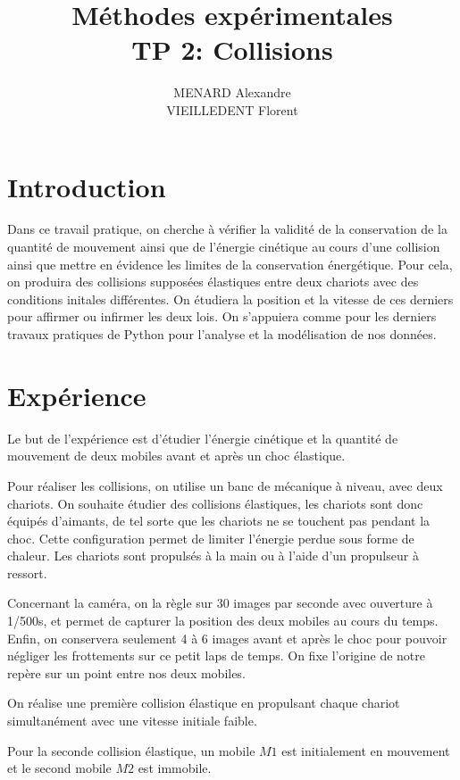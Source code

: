\documentclass[12pt]{article}
\title{\textbf{Méthodes expérimentales} \\ TP 2: Collisions}
\author{MENARD Alexandre \\ VIEILLEDENT Florent}
\begin{document}
\maketitle

\section*{Introduction}
Dans ce travail pratique, on cherche à vérifier la validité de la conservation de la quantité de mouvement 
ainsi que de l'énergie cinétique au cours d'une collision ainsi que mettre en évidence les limites de la conservation énergétique.
Pour cela, on produira des collisions supposées élastiques entre deux chariots avec des conditions initales différentes. On étudiera 
la position et la vitesse de ces derniers pour affirmer ou infirmer
les deux lois. On s'appuiera comme pour les derniers travaux pratiques de Python pour l'analyse et la modélisation de nos données.


\newpage
\section{Expérience}

Le but de l'expérience est d'étudier l'énergie cinétique et la quantité de mouvement de deux mobiles avant et après un choc élastique. 

Pour réaliser les collisions, on utilise un banc de mécanique à niveau, avec deux chariots. On souhaite étudier des collisions élastiques, les chariots sont donc équipés d'aimants, de tel sorte que les chariots ne se touchent pas pendant la choc. Cette configuration permet de limiter l'énergie perdue sous forme de chaleur. Les chariots sont propulsés à la main ou à l'aide d'un propulseur à ressort. 

Concernant la caméra, on la règle sur 30 images par seconde avec ouverture à 1/500s, et permet de capturer la position des deux mobiles au cours du temps.
Enfin, on conservera seulement 4 à 6 images avant et après le choc pour pouvoir négliger les frottements sur ce petit laps de temps. On fixe l'origine de notre repère sur un point entre nos deux mobiles. 

On réalise une première collision élastique en propulsant chaque chariot simultanément avec une vitesse initiale faible.

Pour la seconde collision élastique, un mobile $M1$ est initialement en mouvement et le second mobile $M2$ est immobile.
\end{document}
